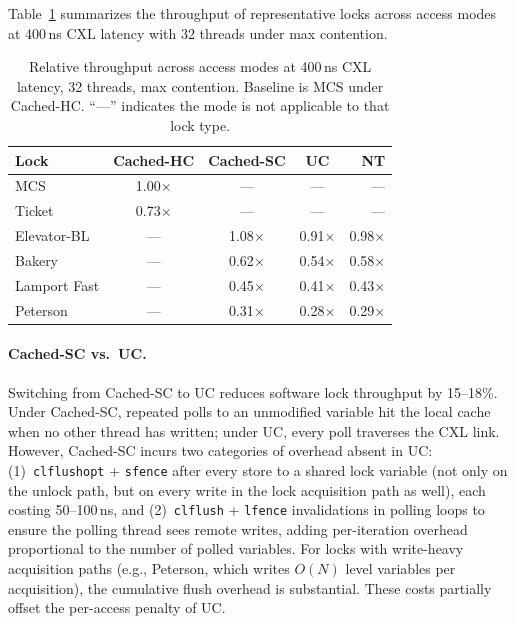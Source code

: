 Table~\ref{tab:access-mode-comparison} summarizes the throughput of representative locks across access modes at 400\,ns CXL latency with 32 threads under max contention.

\begin{table}[t]
    \centering
    \small
    \begin{tabular}{lcccr}
        \toprule
        Lock & Cached-HC & Cached-SC & UC & NT \\
        \midrule
        MCS & 1.00$\times$ & --- & --- & --- \\
        Ticket & 0.73$\times$ & --- & --- & --- \\
        Elevator-BL & --- & 1.08$\times$ & 0.91$\times$ & 0.98$\times$ \\
        Bakery & --- & 0.62$\times$ & 0.54$\times$ & 0.58$\times$ \\
        Lamport Fast & --- & 0.45$\times$ & 0.41$\times$ & 0.43$\times$ \\
        Peterson & --- & 0.31$\times$ & 0.28$\times$ & 0.29$\times$ \\
        \bottomrule
    \end{tabular}
    \caption{Relative throughput across access modes at 400\,ns CXL latency, 32 threads, max contention. Baseline is MCS under Cached-HC. ``---'' indicates the mode is not applicable to that lock type.}
    \label{tab:access-mode-comparison}
\end{table}

\paragraph{Cached-SC vs.\ UC.}
Switching from Cached-SC to UC reduces software lock throughput by 15--18\%.
Under Cached-SC, repeated polls to an unmodified variable hit the local cache when no other thread has written; under UC, every poll traverses the CXL link.
However, Cached-SC incurs two categories of overhead absent in UC:
(1)~\texttt{clflushopt} + \texttt{sfence} after every store to a shared lock variable (not only on the unlock path, but on every write in the lock acquisition path as well), each costing 50--100\,ns, and
(2)~\texttt{clflush} + \texttt{lfence} invalidations in polling loops to ensure the polling thread sees remote writes, adding per-iteration overhead proportional to the number of polled variables.
For locks with write-heavy acquisition paths (e.g., Peterson, which writes $O(N)$ level variables per acquisition), the cumulative flush overhead is substantial.
These costs partially offset the per-access penalty of UC.

